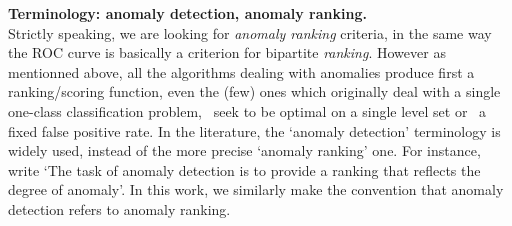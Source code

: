 \begin{remark}{\bf Terminology: anomaly detection, anomaly ranking.\\}
Strictly speaking, we are looking for \emph{anomaly ranking} criteria, in the same way the ROC curve is basically a criterion for bipartite \emph{ranking}.
%
However as mentionned above, all the algorithms dealing with anomalies produce first a ranking/scoring function, even the (few) ones which originally deal with a single one-class classification problem, \ie~seek to be optimal on a single level set or \wrt~a fixed false positive rate.
%
In the literature, the `anomaly detection' terminology is widely used, instead of the more precise `anomaly ranking' one. For instance, \cite{Liu2008} write `The task of anomaly detection is to provide a ranking that reflects the degree of anomaly'.
%
In this work, we similarly make the convention that anomaly detection refers to anomaly ranking. 






\end{remark}


